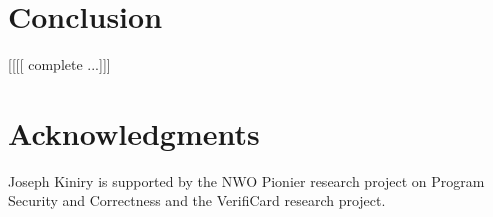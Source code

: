 \documentclass{sig-alternate}
\begin{document}
\section{Conclusion}

[[[[ complete ...]]]

\section{Acknowledgments}

Joseph Kiniry is supported by the NWO Pionier research
project on Program Security and Correctness and the VerifiCard
research project. 


%

%

  


%
%



\end{document}
